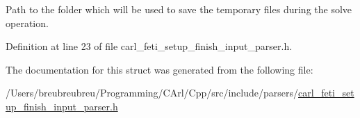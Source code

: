 Path to the folder which will be used to save the temporary files during the solve operation. 



Definition at line 23 of file carl\+\_\+feti\+\_\+setup\+\_\+finish\+\_\+input\+\_\+parser.\+h.



The documentation for this struct was generated from the following file\+:\begin{DoxyCompactItemize}
\item 
/\+Users/breubreubreu/\+Programming/\+C\+Arl/\+Cpp/src/include/parsers/\hyperlink{carl__feti__setup__finish__input__parser_8h}{carl\+\_\+feti\+\_\+setup\+\_\+finish\+\_\+input\+\_\+parser.\+h}\end{DoxyCompactItemize}
